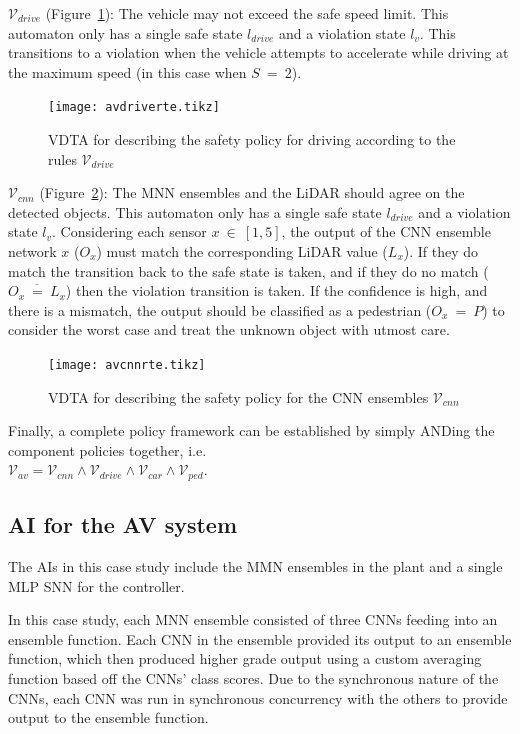 $\mathcal{V}_{drive}$ (Figure~\ref{fig:avdriverte}): The vehicle may not exceed the safe speed limit. 
This automaton only has a single safe state $l_{drive}$ and a violation state $l_v$.
This transitions to a violation when the vehicle attempts to accelerate while driving at the maximum speed (in this case when $S~=~2$).

\begin{figure}[h]
	\centering
	\texttt{[image: avdriverte.tikz]}
	\caption{\ac{VDTA} for describing the safety policy for driving according to the rules $\mathcal{V}_{drive}$\label{fig:avdriverte}}
\end{figure}

$\mathcal{V}_{cnn}$ (Figure~\ref{fig:avcnnrte}): The \ac{MNN} ensembles and the \ac{LiDAR} should agree on the detected objects.
This automaton only has a single safe state $l_{drive}$ and a violation state $l_v$.
Considering each sensor $x~\in~[1,5]$, the output of the \ac{CNN} ensemble network $x$ ($O_x$) must match the corresponding \ac{LiDAR} value ($L_x$).
If they do match the transition back to the safe state is taken, and if they do no match ($\overline{O_x~=~L_x}$) then the violation transition is taken.
If the confidence is high, and there is a mismatch, the output should be classified as a pedestrian ($O_x~=~P$) to consider the worst case and treat the unknown object with utmost care.

\begin{figure}[h]
	\centering
	\texttt{[image: avcnnrte.tikz]}
	\caption{\ac{VDTA} for describing the safety policy for the \ac{CNN} ensembles $\mathcal{V}_{cnn}$\label{fig:avcnnrte}}
\end{figure}

Finally, a complete policy framework can be established by simply ANDing the component policies together, i.e. \\ $\mathcal{V}_{av} = \mathcal{V}_{cnn} \wedge \mathcal{V}_{drive} \wedge \mathcal{V}_{car} \wedge \mathcal{V}_{ped}$.

\subsection{\acf{AI} for the \acf{AV} system}

The \acp{AI} in this case study include the \ac{MMN} ensembles in the plant and a single \ac{MLP} \ac{SNN} for the controller.

In this case study, each \ac{MNN} ensemble consisted of three \acp{CNN} feeding into an ensemble function.
Each \ac{CNN} in the ensemble provided its output to an ensemble function, which then produced higher grade output using a custom averaging function based off the \acp{CNN}' class scores.
Due to the synchronous nature of the \acp{CNN}, each \ac{CNN} was run in synchronous concurrency with the others to provide output to the ensemble function.
	
